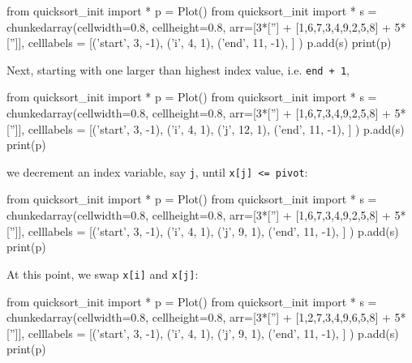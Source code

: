 \begin{python}
from quicksort_init import *
p = Plot()
from quicksort_init import *
s = chunkedarray(cellwidth=0.8, 
                   cellheight=0.8,
                   arr=[3*[''] + [1,6,7,3,4,9,2,5,8] + 5*['']],
                   celllabels = [('start', 3, -1),
                                 ('i', 4, 1),
                                 ('end',   11, -1),
                                ]
)
p.add(s)
print(p)
\end{python}

Next, starting with one larger than highest index value, i.e.
\verb!end + 1!,

\begin{python}
from quicksort_init import *
p = Plot()
from quicksort_init import *
s = chunkedarray(cellwidth=0.8, 
                   cellheight=0.8,
                   arr=[3*[''] + [1,6,7,3,4,9,2,5,8] + 5*['']],
                   celllabels = [('start', 3, -1),
                                 ('i', 4, 1),
                                 ('j', 12, 1),
                                 ('end',   11, -1),
                                ]
)
p.add(s)
print(p)
\end{python}

we decrement an index variable, say \verb!j!,
until \verb!x[j] <= pivot!:

\begin{python}
from quicksort_init import *
p = Plot()
from quicksort_init import *
s = chunkedarray(cellwidth=0.8, 
                   cellheight=0.8,
                   arr=[3*[''] + [1,6,7,3,4,9,2,5,8] + 5*['']],
                   celllabels = [('start', 3, -1),
                                 ('i', 4, 1),
                                 ('j', 9, 1),
                                 ('end',   11, -1),
                                ]
)
p.add(s)
print(p)
\end{python}

At this point, we swap \verb!x[i]! and \verb!x[j]!:

\begin{python}
from quicksort_init import *
p = Plot()
from quicksort_init import *
s = chunkedarray(cellwidth=0.8, 
                   cellheight=0.8,
                   arr=[3*[''] + [1,2,7,3,4,9,6,5,8] + 5*['']],
                   celllabels = [('start', 3, -1),
                                 ('i', 4, 1),
                                 ('j', 9, 1),
                                 ('end',   11, -1),
                                ]
)
p.add(s)
print(p)
\end{python}

